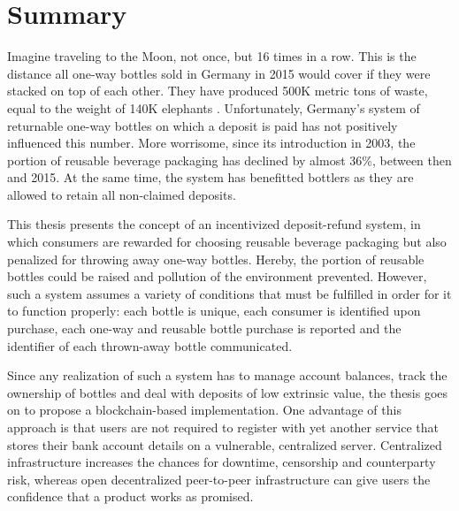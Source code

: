 
\chapter{Summary}
\label{chp:summary}

Imagine traveling to the Moon, not once, but 16 times in a row. This is the distance all one-way bottles sold in Germany in 2015 would cover if they were stacked on top of each other. They have produced 500K metric tons of waste, equal to the weight of 140K elephants \cite{duh2017}. Unfortunately, Germany's system of returnable one-way bottles on which a deposit is paid has not positively influenced this number. More worrisome, since its introduction in 2003, the portion of reusable beverage packaging has declined by almost 36\%, between then and 2015. At the same time, the system has benefitted bottlers as they are allowed to retain all non-claimed deposits.

This thesis presents the concept of an incentivized deposit-refund system, in which consumers are rewarded for choosing reusable beverage packaging but also penalized for throwing away one-way bottles. Hereby, the portion of reusable bottles could be raised and pollution of the environment prevented. However, such a system assumes a variety of conditions that must be fulfilled in order for it to function properly: each bottle is unique, each consumer is identified upon purchase,  each one-way and reusable bottle purchase is reported and the identifier of each thrown-away bottle communicated.


Since any realization of such a system has to manage account balances, track the ownership of bottles and deal with deposits of low extrinsic value, the thesis goes on to propose a blockchain-based implementation. One advantage of this approach is that users are not required to register with yet another service that stores their bank account details on a vulnerable, centralized server. Centralized infrastructure increases the chances for downtime, censorship and counterparty risk, whereas open decentralized peer-to-peer infrastructure can give users the confidence that a product works as promised.

